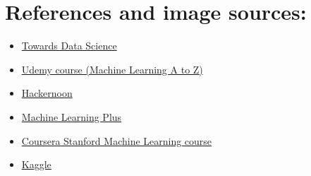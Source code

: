 \documentclass{42-en}
\begin{document}
\section*{References and image sources:}
\begin{itemize}
    \item \href{https://towardsdatascience.com/}{Towards Data Science}
    \item \href{https://www.udemy.com/machinelearning/}{Udemy course (Machine Learning A to Z)}
    \item \href{https://hackernoon.com/}{Hackernoon}
    \item \href{https://www.machinelearningplus.com/}{Machine Learning Plus}
    \item \href{https://www.coursera.org/courses?query=machine\%20learning\%20stanford}{Coursera Stanford Machine Learning course}
    \item \href{https://www.kaggle.com/}{Kaggle}
\end{itemize}
\end{document}
